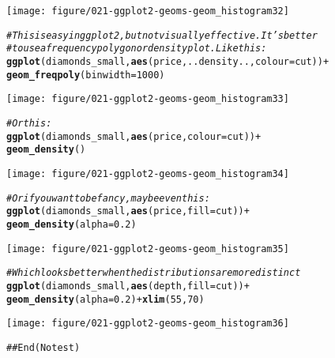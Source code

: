 \documentclass[a4paper,titlepage]{tufte-handout}\usepackage[]{graphicx}\usepackage[]{color}
\makeatletter
\def\maxwidth{ %
  \ifdim\Gin@nat@width>\linewidth
    \linewidth
  \else
    \Gin@nat@width
  \fi
}
\newcommand{\hlnum}[1]{\textcolor[rgb]{0.686,0.059,0.569}{#1}}%
\newcommand{\hlcom}[1]{\textcolor[rgb]{0.678,0.584,0.686}{\textit{#1}}}%
\newcommand{\hlopt}[1]{\textcolor[rgb]{0,0,0}{#1}}%
\newcommand{\hlstd}[1]{\textcolor[rgb]{0.345,0.345,0.345}{#1}}%
\newcommand{\hlkwc}[1]{\textcolor[rgb]{0.333,0.667,0.333}{#1}}%
\newcommand{\hlkwd}[1]{\textcolor[rgb]{0.737,0.353,0.396}{\textbf{#1}}}%
\newenvironment{kframe}{%
 \def\at@end@of@kframe{}%
 \ifinner\ifhmode%
  \def\at@end@of@kframe{\end{minipage}}%
  \begin{minipage}{\columnwidth}%
 \fi\fi%
 \def\FrameCommand##1{\hskip\@totalleftmargin \hskip-\fboxsep
 \colorbox{shadecolor}{##1}\hskip-\fboxsep
     \hskip-\linewidth \hskip-\@totalleftmargin \hskip\columnwidth}%
 \MakeFramed {\advance\hsize-\width
   \@totalleftmargin\z@ \linewidth\hsize
   \@setminipage}}%
 {\par\unskip\endMakeFramed%
 \at@end@of@kframe}
\newenvironment{knitrout}{}{} %
\makeatother
\begin{document}
\begin{knitrout}
\begin{kframe}
{\ttfamily\noindent\itshape\color{messagecolor}{\#\# stat\_bin: binwidth defaulted to range/30. Use 'binwidth = x' to adjust this.}}\end{kframe}
\texttt{[image: figure/021-ggplot2-geoms-geom\_histogram32]} 
\begin{kframe}\begin{alltt}
\hlcom{# This is easy in ggplot2, but not visually effective.  It's better}
\hlcom{# to use a frequency polygon or density plot.  Like this:}
\hlkwd{ggplot}\hlstd{(diamonds_small,} \hlkwd{aes}\hlstd{(price, ..density..,} \hlkwc{colour} \hlstd{= cut))} \hlopt{+}
  \hlkwd{geom_freqpoly}\hlstd{(}\hlkwc{binwidth} \hlstd{=} \hlnum{1000}\hlstd{)}
\end{alltt}
\end{kframe}
\texttt{[image: figure/021-ggplot2-geoms-geom\_histogram33]} 
\begin{kframe}\begin{alltt}
\hlcom{# Or this:}
\hlkwd{ggplot}\hlstd{(diamonds_small,} \hlkwd{aes}\hlstd{(price,} \hlkwc{colour} \hlstd{= cut))} \hlopt{+}
  \hlkwd{geom_density}\hlstd{()}
\end{alltt}
\end{kframe}
\texttt{[image: figure/021-ggplot2-geoms-geom\_histogram34]} 
\begin{kframe}\begin{alltt}
\hlcom{# Or if you want to be fancy, maybe even this:}
\hlkwd{ggplot}\hlstd{(diamonds_small,} \hlkwd{aes}\hlstd{(price,} \hlkwc{fill} \hlstd{= cut))} \hlopt{+}
  \hlkwd{geom_density}\hlstd{(}\hlkwc{alpha} \hlstd{=} \hlnum{0.2}\hlstd{)}
\end{alltt}
\end{kframe}
\texttt{[image: figure/021-ggplot2-geoms-geom\_histogram35]} 
\begin{kframe}\begin{alltt}
\hlcom{# Which looks better when the distributions are more distinct}
\hlkwd{ggplot}\hlstd{(diamonds_small,} \hlkwd{aes}\hlstd{(depth,} \hlkwc{fill} \hlstd{= cut))} \hlopt{+}
  \hlkwd{geom_density}\hlstd{(}\hlkwc{alpha} \hlstd{=} \hlnum{0.2}\hlstd{)} \hlopt{+} \hlkwd{xlim}\hlstd{(}\hlnum{55}\hlstd{,} \hlnum{70}\hlstd{)}
\end{alltt}


{\ttfamily\noindent\color{warningcolor}{\#\# Warning: Removed 2 rows containing non-finite values (stat\_density).}}\end{kframe}
\texttt{[image: figure/021-ggplot2-geoms-geom\_histogram36]} 
\begin{kframe}\begin{alltt}
## End(No test)


\end{alltt}
\end{kframe}
\end{knitrout}
\end{document}
